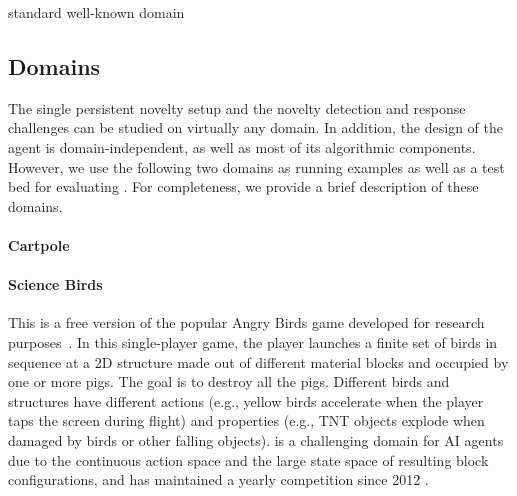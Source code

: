  standard well-known domain






\subsection{Domains}
The single persistent novelty setup and the novelty detection and response challenges can be studied on virtually any domain. In addition, the design of the agent is domain-independent, as well as most of its algorithmic components. 
However, we use the following two domains as running examples as well as a test bed for evaluating \hydra. 
For completeness, we provide a brief description of these domains.




\paragraph{Cartpole}






\paragraph{Science Birds}
This is a free version of the popular Angry Birds game developed for research purposes~\cite{renz2019ai}. 
In this single-player game, the player launches a finite set of birds in sequence
at a 2D structure made out of different material blocks and occupied by one or more pigs. The goal is to destroy all the pigs. 
Different birds and structures have different actions (e.g., yellow birds accelerate when the player taps the screen during flight) and properties (e.g., TNT objects explode when damaged by birds or other falling objects).
\sbirds is a challenging domain for AI agents due to the continuous action space and the large state space of resulting block configurations, and has maintained a yearly competition since 2012 \cite{renz2019ai}.


